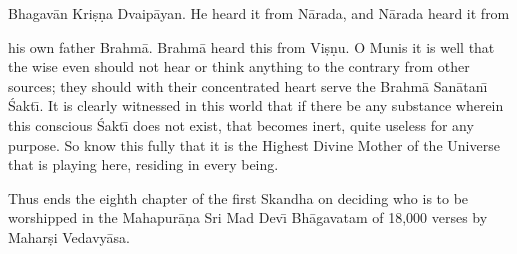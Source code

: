 Bhagav\=an Kri\d{s}\d{n}a Dvaip\=ayan. He heard it from N\=arada, and N\=arada heard it from

his own father Brahm\=a. Brahm\=a heard this from Vi\d{s}\d{n}u. O Munis it is well that the wise even should not hear or think anything to the contrary from other sources; they should with their concentrated heart serve the Brahm\=a San\=atan\={\i} \'Sakt\={\i}. It is clearly witnessed in this world that if there be any substance wherein this conscious \'Sakt\={\i} does not exist, that becomes inert, quite useless for any purpose. So know this fully that it is the Highest Divine Mother of the Universe that is playing here, residing in every being.

Thus ends the eighth chapter of the first Skandha on deciding who is to be worshipped in the Mahapur\=a\d{n}a Sri Mad Dev\={\i} Bh\=agavatam of 18,000 verses by Mahar\d{s}i Vedavy\=asa.



